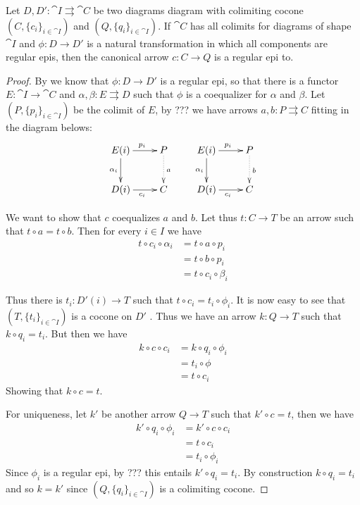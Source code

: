 \begin{lemma}\label{lem:regepi}
	Let $D, D'\colon \cat{I}\rightrightarrows  \cat{C}$ be two diagrams diagram with colimiting cocone $(C, \{c_i\}_{i\in \cat{I}})$ and   $(Q, \{q_i\}_{i\in \cat{I}})$. If $\cat{C}$ has all colimits for diagrams of shape $\cat{I}$ and $\phi\colon D\to D'$ is a natural transformation in which all components are regular epis, then the canonical arrow  $c\colon C\to Q$ is a regular epi to.
\end{lemma}
\begin{proof}
	By  we know that $\phi\colon D\to D'$ is a regular epi, so that there is a functor $E\colon \cat{I}\to \cat{C}$ and $\alpha, \beta\colon E\rightrightarrows D$ such that $\phi$ is a coequalizer for $\alpha$ and $\beta$. Let $(P, \{p_i\}_{i\in \cat{I}})$ be the colimit of $E$, by ??? we have arrows $a, b\colon P\rightrightarrows  C$ fitting in the diagram belows:
	\[\xymatrix{E(i) \ar[r]^{p_i} \ar[d]_{\alpha_i}& P \ar@{.>}[d]^{a} & E(i) \ar[r]^{p_i} \ar[d]_{\alpha_i} & P \ar@{.>}[d]^{b}\\ D(i) \ar[r]_{c_i} & C & D(i) \ar[r]_{c_i} & C}\]
	
	We want to show that $c$ coequalizes $a$ and $b$. Let thus $t\colon C\to T$ be an arrow such that $t\circ a=t\circ b$. Then for every $i\in I$ we have 
	\begin{align*}
		t\circ c_i\circ \alpha_i&=t\circ a\circ p_i\\&=t\circ b\circ p_i\\&=t\circ c_i\circ \beta_i
	\end{align*}
	
	Thus there is $t_i\colon D'(i)\to T$ such that $t\circ c_i=t_i\circ \phi_i$. It is now easy to see that $(T, \{t_i\}_{i\in \cat{I}})$ is a cocone on $D'$ .  Thus we have an arrow $k\colon Q\to T$ such that $k\circ q_i=t_i$. But then we have
	\begin{align*}
		k\circ c\circ c_i&=k\circ q_i\circ \phi_i\\&=t_i\circ \phi\\&=t\circ c_i
	\end{align*}
	Showing that $k\circ c=t$. 
	
	For uniqueness, let $k'$ be another arrow $Q\to T$ such that $k'\circ c=t$, then we have
	\begin{align*}
		k'\circ q_i\circ \phi_i&=k'\circ c\circ c_i\\&=t\circ c_i\\&=t_i\circ \phi_i
	\end{align*}
	Since $\phi_i$ is a regular epi, by ??? this entails $k'\circ q_i=t_i$. By construction $k\circ q_i=t_i$ and  so $k=k'$ since $(Q, \{q_i\}_{i\in \cat{I}})$ is a colimiting cocone.
\end{proof}




